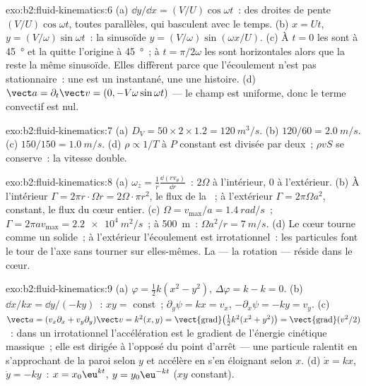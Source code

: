 \begin{solution}{exo:b2:fluid-kinematics:6}
(a) $\dd y/\dd x = (V/U)\cos\omega t$~: des droites de pente
$(V/U)\cos\omega t$, toutes parallèles, qui basculent avec le temps. (b) $x = Ut$, $y =
(V/\omega)\sin\omega t$~: la sinusoïde $y = (V/\omega)\sin(\omega x/U)$. (c) À
$t = 0$ les  sont à \qty{45}{\degree} et la  quitte
l'origine à \qty{45}{\degree}~; à $t = \pi/2\omega$ les  sont
horizontales alors que la  reste la même sinusoïde. Elles diffèrent parce que
l'écoulement n'est pas stationnaire~: une  est un instantané, une  une histoire.
(d) $\vect a = \partial_t\vect v = (0, -V\omega\sin\omega t)$ --- le champ est
uniforme, donc le terme convectif est nul.
\end{solution}

\begin{solution}{exo:b2:fluid-kinematics:7}
(a) $D_V = 50 \times 2 \times 1.2 = \qty{120}{m^3/s}$. (b) $120/60 = \qty{2.0}{m/s}$.
(c) $150/150 = \qty{1.0}{m/s}$. (d) $\rho \propto 1/T$ à $P$ constant est divisée par deux~;
$\rho vS$ se conserve~: la vitesse double.
\end{solution}

\begin{solution}{exo:b2:fluid-kinematics:8}
(a) $\omega_z = \frac1r\frac{\dd(rv_\theta)}{\dd r}$~: $2\Omega$ à l'intérieur, $0$
à l'extérieur. (b) À l'intérieur $\Gamma = 2\pi r\cdot\Omega r = 2\Omega\cdot\pi r^2$, le flux
de la ~; à l'extérieur $\Gamma = 2\pi\Omega a^2$, constant, le flux
du cœur entier. (c) $\Omega = v_{\max}/a = \qty{1.4}{rad/s}$~; $\Gamma = 2\pi av_{\max}
= \qty{2.2e4}{m^2/s}$~; à \qty{500}{m}~: $\Omega a^2/r = \qty{7}{m/s}$. (d) Le
cœur tourne comme un solide~; à l'extérieur l'écoulement est irrotationnel~: les particules
font le tour de l'axe sans tourner sur elles-mêmes. La  ---
la rotation --- réside dans le cœur.
\end{solution}

\begin{solution}{exo:b2:fluid-kinematics:9}
(a) $\varphi = \tfrac12k(x^2 - y^2)$, $\Delta\varphi = k - k = 0$. (b) $\dd x/
kx = \dd y/(-ky)$~: $xy = $ const~; $\partial_y\psi = kx = v_x$, $-\partial_x\psi =
-ky = v_y$. (c) $\vect a = (v_x\partial_x + v_y\partial_y)\vect v = k^2(x, y) =
\operatorname{\vect{grad}}\bigl(\tfrac12k^2(x^2 + y^2)\bigr) = \operatorname{\vect{grad}}
(v^2/2)$~: dans un  irrotationnel l'accélération est le
gradient de l'énergie cinétique massique~; elle est dirigée à l'opposé du
point d'arrêt --- une particule ralentit en s'approchant de la paroi
selon $y$ et accélère en s'en éloignant selon $x$. (d) $\dot x = kx$, $\dot y = -ky$~:
$x = x_0\eu^{kt}$, $y = y_0\eu^{-kt}$ ($xy$ constant).
\end{solution}

